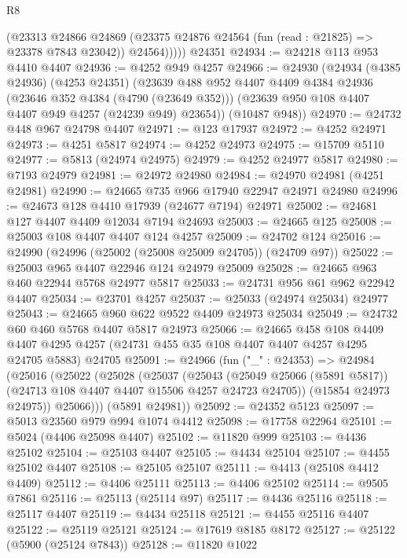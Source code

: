 \begin{lexlean}{R8}
\begin{coremodule}
            (@23313
              @24866
              @24869
              (@23375 @24876 @24564 (fun (read : @21825) => @23378 @7843 @23042))
              @24564)))))
    @24351
@24934 := @24218 @113 @953 @4410 @4407
@24936 := @4252 @949 @4257
@24966 := @24930
    (@24934
      (@4385 @24936)
      (@4253 @24351)
      (@23639
        @488
        @952
        @4407
        @4409
        @4384
        @24936
        (@23646 @352 @4384 (@4790 (@23649 @352)))
        (@23639 @950 @108 @4407 @4407 @949 @4257 (@24239 @949) @23654))
      (@10487 @948))
@24970 := @24732 @448 @967 @24798 @4407
@24971 := @123 @17937
@24972 := @4252 @24971
@24973 := @4251 @5817
@24974 := @4252 @24973
@24975 := @15709 @5110
@24977 := @5813 (@24974 @24975)
@24979 := @4252 @24977 @5817
@24980 := @7193 @24979
@24981 := @24972 @24980
@24984 := @24970 @24981 (@4251 @24981)
@24990 := @24665 @735 @966 @17940 @22947 @24971 @24980
@24996 := @24673 @128 @4410 @17939 (@24677 @7194) @24971
@25002 := @24681 @127 @4407 @4409 @12034 @7194 @24693
@25003 := @24665 @125
@25008 := @25003 @108 @4407 @4407 @124 @4257
@25009 := @24702 @124
@25016 := @24990 (@24996 (@25002 (@25008 @25009 @24705)) (@24709 @97))
@25022 := @25003 @965 @4407 @22946 @124 @24979 @25009
@25028 := @24665 @963 @460 @22944 @5768 @24977 @5817
@25033 := @24731 @956 @61 @962 @22942 @4407
@25034 := @23701 @4257
@25037 := @25033 (@24974 @25034) @24977
@25043 := @24665 @960 @622 @9522 @4409 @24973 @25034
@25049 := @24732 @60 @460 @5768 @4407 @5817 @24973
@25066 := @24665
    @458
    @108
    @4409
    @4407
    @4295
    @4257
    (@24731 @455 @35 @108 @4407 @4407 @4257 @4295 @24705 @5883)
    @24705
@25091 := @24966
    (fun ("_" : @24353) =>
    @24984
      (@25016
        (@25022
          (@25028
            (@25037
              (@25043
                (@25049 @25066 (@5891 @5817))
                (@24713 @108 @4407 @4407 @15506 @4257 @24723 @24705))
              (@15854 @24973 @24975))
            @25066)))
      (@5891 @24981))
@25092 := @24352 @5123
@25097 := @5013 @23560 @979 @994 @1074 @4412
@25098 := @17758 @22964
@25101 := @5024 (@4406 @25098 @4407)
@25102 := @11820 @999
@25103 := @4436 @25102
@25104 := @25103 @4407
@25105 := @4434 @25104
@25107 := @4455 @25102 @4407
@25108 := @25105 @25107
@25111 := @4413 (@25108 @4412 @4409)
@25112 := @4406 @25111
@25113 := @4406 @25102
@25114 := @9505 @7861
@25116 := @25113 (@25114 @97)
@25117 := @4436 @25116
@25118 := @25117 @4407
@25119 := @4434 @25118
@25121 := @4455 @25116 @4407
@25122 := @25119 @25121
@25124 := @17619 @8185 @8172
@25127 := @25122 (@5900 (@25124 @7843))
@25128 := @11820 @1022

\end{coremodule}
\end{lexlean}
